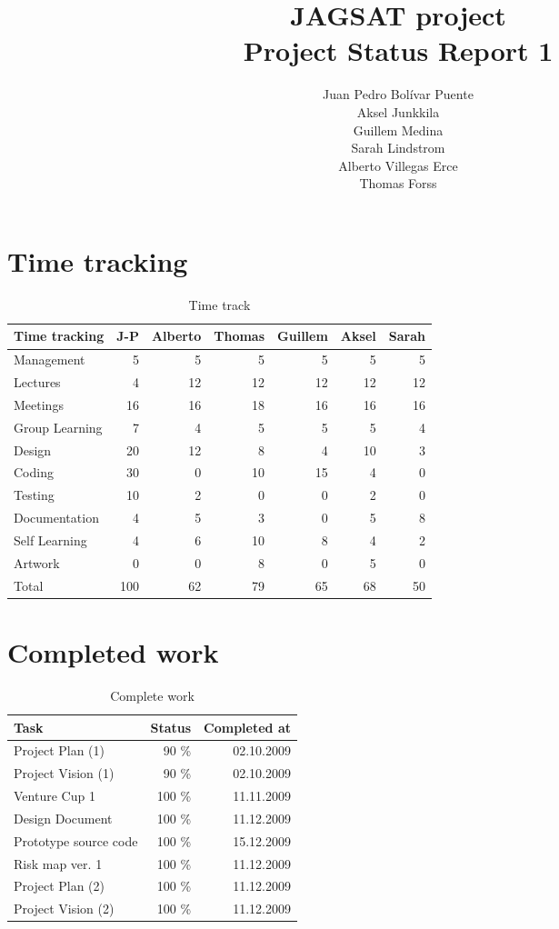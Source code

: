 \documentclass[12pt,a4paper]{article}
\title{\large JAGSAT project\\\huge Project Status Report 1}
\author{
  Juan Pedro Bolívar Puente\\ 
  Aksel Junkkila\\
  Guillem Medina\\ 
  Sarah Lindstrom\\ 
  Alberto Villegas Erce\\ 
  Thomas Forss
}
\begin{document}
\maketitle

\tableofcontents
\pagebreak

\section{Time tracking}

\begin{table}[h!]
\small
\begin{tabular}{ l | r | r | r | r | r | r}
Time tracking	&J-P	&Alberto	&Thomas	&Guillem	&Aksel	&Sarah\\\hline\hline
Management	&5	&5		&5		&5		&5		&5\\
Lectures		&4	&12		&12		&12		&12		&12\\
Meetings		&16	&16		&18		&16		&16		&16\\
Group Learning&7	&4		&5		&5		&5		&4\\
Design		&20	&12		&8		&4		&10		&3\\
Coding		&30	&0		&10		&15		&4		&0\\
Testing		&10	&2		&0		&0		&2		&0\\
Documentation&4	&5		&3		&0		&5		&8\\
Self Learning	&4	&6		&10		&8		&4		&2\\
Artwork		&0	&0		&8		&0		&5		&0\\
Total			&100&62		&79		&65		&68		&50
\end{tabular}
\caption{Time track}
\label{tab:timetrack}
\end{table}

\section{Completed work}

\begin{table}[h!]
\small
\begin{tabular}{ l | r | r}
Task					&Status	&Completed at\\\hline\hline
Project Plan (1)			&90 \%	&02.10.2009\\
Project Vision (1)		&90 \%	&02.10.2009\\
Venture Cup 1			&100 \%	&11.11.2009\\
Design Document		&100 \%	&11.12.2009\\
Prototype source code	&100 \%	&15.12.2009\\
Risk map ver. 1			&100 \%	&11.12.2009\\
Project Plan (2)			&100 \%	&11.12.2009\\
Project Vision (2)		&100 \%	&11.12.2009\\
\end{tabular}
\caption{Complete work}
\label{tab:compwork}
\end{table}
\end{document}
